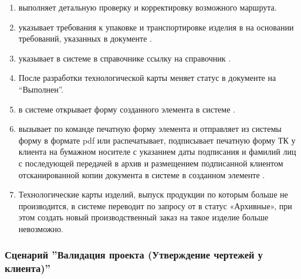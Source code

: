 \begin{enumerate}
\item	\tehnolog выполняет детальную проверку и корректировку возможного маршрута.
\item	\tehnolog указывает требования к упаковке и транспортировке изделия в  на основании требований, указанных в документе .
\item	\tehnolog указывает в системе \gofro в справочнике  ссылку на справочник .
\item	После разработки технологической карты \tehnolog меняет статус в документе  на “Выполнен”. 
\item	\manager в системе \gofro открывает форму созданного элемента  в системе \gofro.
\item \manager вызывает по команде  печатную форму элемента  и отправляет из системы \gofro форму в формате pdf или распечатывает, подписывает печатную форму ТК у клиента на бумажном носителе с указанием даты подписания и фамилий лиц с последующей передачей в архив и размещением подписанной клиентом отсканированной копии документа в системе \gofro в созданном элементе .

\item	Технологические карты изделий, выпуск продукции по которым больше не производится,  \tehnolog в системе \gofro переводит по запросу от \manager в статус «Архивные», при этом создать новый производственный заказ на такое изделие больше невозможно.

\end{enumerate}





\subsubsection{Сценарий ''Валидация проекта (Утверждение чертежей у клиента)''}
\label{bp:pm_2}

